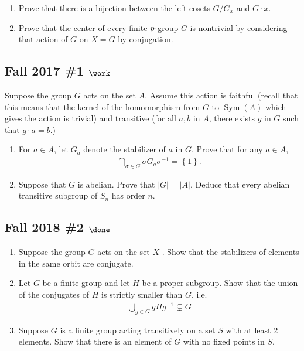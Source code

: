\begin{enumerate}
\def\labelenumi{\alph{enumi}.}
\item
  Prove that there is a bijection between the left cosets \(G/G_x\) and
  \(G\cdot x\).
\item
  Prove that the center of every finite \(p{\hbox{-}}\)group \(G\) is
  nontrivial by considering that action of \(G\) on \(X=G\) by
  conjugation.
\end{enumerate}

\hypertarget{fall-2017-1-work}{%
\subsection{\texorpdfstring{Fall 2017 \#1
\(\work\)}{Fall 2017 \#1 \textbackslash work}}\label{fall-2017-1-work}}

Suppose the group \(G\) acts on the set \(A\). Assume this action is
faithful (recall that this means that the kernel of the homomorphism
from \(G\) to \(\operatorname{Sym}(A)\) which gives the action is
trivial) and transitive (for all \(a, b\) in \(A\), there exists \(g\)
in \(G\) such that \(g \cdot a = b\).)

\begin{enumerate}
\def\labelenumi{\alph{enumi}.}
\item
  For \(a \in A\), let \(G_a\) denote the stabilizer of \(a\) in \(G\).
  Prove that for any \(a \in A\),
  \begin{align*}
  \displaystyle\bigcap_{\sigma\in G} \sigma G_a \sigma^{-1}= \left\{{1}\right\}
  .\end{align*}
\item
  Suppose that \(G\) is abelian. Prove that \(|G| = |A|\). Deduce that
  every abelian transitive subgroup of \(S_n\) has order \(n\).
\end{enumerate}

\hypertarget{fall-2018-2-done}{%
\subsection{\texorpdfstring{Fall 2018 \#2
\(\done\)}{Fall 2018 \#2 \textbackslash done}}\label{fall-2018-2-done}}

\begin{enumerate}
\def\labelenumi{\alph{enumi}.}
\item
  Suppose the group \(G\) acts on the set \(X\) . Show that the
  stabilizers of elements in the same orbit are conjugate.
\item
  Let \(G\) be a finite group and let \(H\) be a proper subgroup. Show
  that the union of the conjugates of \(H\) is strictly smaller than
  \(G\), i.e.
  \begin{align*}
  \displaystyle\bigcup_{g\in G} gHg^{-1}\subsetneq G
  \end{align*}
\item
  Suppose \(G\) is a finite group acting transitively on a set \(S\)
  with at least 2 elements. Show that there is an element of \(G\) with
  no fixed points in \(S\).
\end{enumerate}

